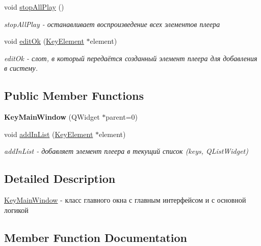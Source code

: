 \begin{DoxyCompactItemize}
\mbox{\label{class_key_main_window_a2fe2594084ecccb578c5991b8bf9844b}} 
void \hyperlink{class_key_main_window_a2fe2594084ecccb578c5991b8bf9844b}{stop\+All\+Play} ()
\begin{DoxyCompactList}\small\item\em stop\+All\+Play -\/ останавливает воспроизведение всех элементов плеера \end{DoxyCompactList}\item 
void \hyperlink{class_key_main_window_aaf05ff47462e7e4e396edc946a64fd7d}{edit\+Ok} (\hyperlink{class_key_element}{Key\+Element} $\ast$element)
\begin{DoxyCompactList}\small\item\em edit\+Ok -\/ слот, в который передаётся созданный элемент плеера для добавления в систему. \end{DoxyCompactList}\end{DoxyCompactItemize}
\subsection*{Public Member Functions}
\begin{DoxyCompactItemize}
\item 
\mbox{\label{class_key_main_window_a91ed8b3bdc93749b0be61f28cffbb07a}} 
{\bfseries Key\+Main\+Window} (Q\+Widget $\ast$parent=0)
\item 
void \hyperlink{class_key_main_window_ac8658a2a9309909505bf6c0780919068}{add\+In\+List} (\hyperlink{class_key_element}{Key\+Element} $\ast$element)
\begin{DoxyCompactList}\small\item\em add\+In\+List -\/ добавляет элемент плеера в текущий список (keys, Q\+List\+Widget) \end{DoxyCompactList}\end{DoxyCompactItemize}


\subsection{Detailed Description}
\hyperlink{class_key_main_window}{Key\+Main\+Window} -\/ класс главного окна с главным интерфейсом и с основной логикой 

\subsection{Member Function Documentation}
\mbox{\label{class_key_main_window_ac8658a2a9309909505bf6c0780919068}} 
